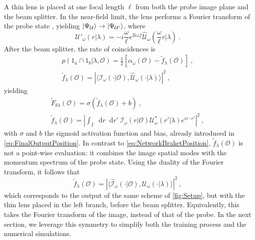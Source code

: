 \documentclass[reprint,
superscriptaddress,
nofootinbib,
aps,
pra,
showkeys
]{revtex4-2}
\newcommand*\dif{\mathop{}\!\mathrm{d}}
\newcommand{\I}{\mathcal{I}}
\newcommand{\U}{\mathcal{U}}
\newcommand{\f}{f}
\newcommand{\F}{F}
\renewcommand{\O}{\mathcal{O}}
\begin{document}
\begin{widetext}
A thin lens is placed at one focal length $\ell$ from both the probe image plane and the beam splitter. In the near-field limit, the lens performs a Fourier transform of the probe state \citep{art:Rezai}, yielding $\ket{\Psi_\U} \to \ket{\Psi_{\U'}}$, where
\begin{equation}
	\U'_\omega(r|\lambda) = -i \frac{\omega}{\ell} e^{2i \omega f} \hat{\U}_{\omega}\left(\frac{\omega}{\ell}r\big|\lambda\right) \ .
	\label{eq:Lens}
\end{equation}
After the beam splitter, the rate of coincidences is
\begin{gather}
    p(1_a \cap 1_b|\lambda, \O) = \frac{1}{2}\left[\alpha_\omega(\O) - \widetilde{\f}_\lambda(\O) \right] 
    \label{eq:BosonicCoincidencesFourier} \ , \\
	\widetilde{\f}_\lambda(\O) =  \left| \langle \I_\omega(\cdot|\O),\hat{\U}_\omega (\cdot|\lambda) \rangle \right|^2 \ ,
	\label{eq:NetworkBraketFourierInProbe}
\end{gather}
yielding
\begin{gather}
	\widetilde{\F}_{b\lambda}(\O) = \sigma(\widetilde{\f}_{\lambda}(\O) + b) \ , \label{eq:FinalOutputFourier} \\
	\widetilde{\f}_\lambda(\O) = \left| \int_I \dif r \dif r' \ \I_\omega(r|\O)\U_{\omega}^*(r'|\lambda)e^{i r\cdot r'} \right|^2 \ , \label{eq:NetworkFourier}	
\end{gather}
with $\sigma$ and $b$ the sigmoid activation function and bias, already introduced in \cref{eq:FinalOutputPosition}. In contrast to \cref{eq:NetworkBraketPosition}, $\widetilde{\f}_\lambda(\O)$ is not a point-wise evaluation: it combines the image spatial modes with the momentum spectrum of the probe state. Using the duality of the Fourier transform, it follows that
\begin{equation}
	\widetilde{\f}_\lambda(\O) =  \left| \langle \hat{\I}_\omega(\cdot|\O),\U_\omega (\cdot|\lambda) \rangle \right|^2 \ ,
	\label{eq:NetworkBraketFourierInImage}
\end{equation}
which corresponds to the output of the same scheme of \cref{fig:Setup}, but with the thin lens placed in the left branch, before the beam splitter. Equivalently, this takes the Fourier transform of the image, instead of that of the probe. In the next section, we leverage this symmetry to simplify both the training process and the numerical simulations.


\end{widetext}
\end{document}

